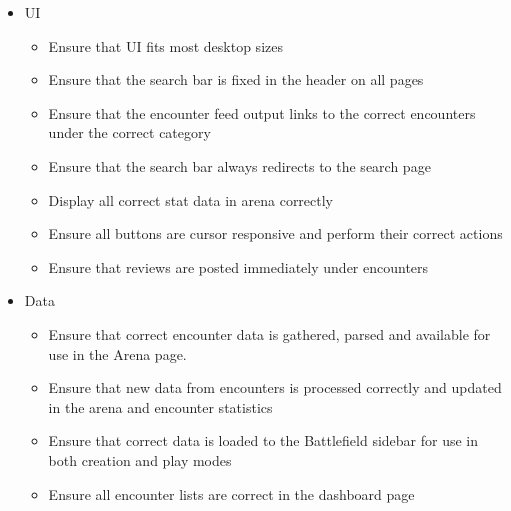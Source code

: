 \documentclass[12pt,a4paper]{report}
\begin{document}
	\begin{itemize}
		\item{UI}
		\begin{itemize}
			\item Ensure that UI fits most desktop sizes 
			\item Ensure that the search bar is fixed in the header on all pages
			\item Ensure that the encounter feed output links to the correct encounters under the correct category
			\item Ensure that the search bar always redirects to the search page
			\item Display all correct stat data in arena correctly
			\item Ensure all buttons are cursor responsive and perform their correct actions
			\item Ensure that reviews are posted immediately under encounters
		\end{itemize}
		\item Data
		\begin{itemize}
			\item Ensure that correct encounter data is gathered, parsed and available for use in the Arena page.
			\item Ensure that new data from encounters is processed correctly and updated in the arena and encounter statistics
			\item Ensure that correct data is loaded to the Battlefield sidebar for use in both creation and play modes
			\item Ensure all encounter lists are correct in the dashboard page
		\end{itemize}
	\end{itemize}

	
\end{document}
